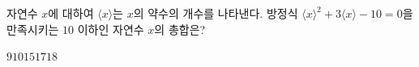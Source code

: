 자연수 $x$에 대하여 $\langle x\rangle$는 $x$의 약수의 개수를 나타낸다. 방정식 $\langle x\rangle^2+3\langle x\rangle-10=0$을 만족시키는 $10$ 이하인 자연수 $x$의 총합은?
\begin{choices32}{$9$}{$10$}{$15$}{$17$}{$18$}\end{choices32}
